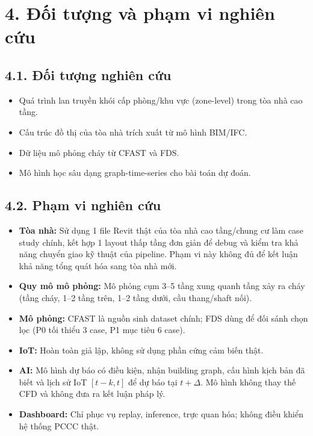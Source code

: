 \section*{4. Đối tượng và phạm vi nghiên cứu}

\subsection*{4.1. Đối tượng nghiên cứu}

\begin{itemize}
  \item Quá trình lan truyền khói cấp phòng/khu vực (zone-level) trong tòa nhà cao tầng.
  \item Cấu trúc đồ thị của tòa nhà trích xuất từ mô hình BIM/IFC.
  \item Dữ liệu mô phỏng cháy từ CFAST và FDS.
  \item Mô hình học sâu dạng graph-time-series cho bài toán dự đoán.
\end{itemize}

\subsection*{4.2. Phạm vi nghiên cứu}

\begin{itemize}
  \item \textbf{Tòa nhà:} Sử dụng 1 file Revit thật của tòa nhà cao tầng/chung cư làm case study chính, kết hợp 1 layout thấp tầng đơn giản để debug và kiểm tra khả năng chuyển giao kỹ thuật của pipeline. Phạm vi này không đủ để kết luận khả năng tổng quát hóa sang tòa nhà mới.
  \item \textbf{Quy mô mô phỏng:} Mô phỏng cụm 3–5 tầng xung quanh tầng xảy ra cháy (tầng cháy, 1–2 tầng trên, 1–2 tầng dưới, cầu thang/shaft nối).
  \item \textbf{Mô phỏng:} CFAST là nguồn sinh dataset chính; FDS dùng để đối sánh chọn lọc (P0 tối thiểu 3 case, P1 mục tiêu 6 case).
  \item \textbf{IoT:} Hoàn toàn giả lập, không sử dụng phần cứng cảm biến thật.
  \item \textbf{AI:} Mô hình dự báo có điều kiện, nhận building graph, cấu hình kịch bản đã biết và lịch sử IoT $[t-k,t]$ để dự báo tại $t+\Delta$. Mô hình không thay thế CFD và không đưa ra kết luận pháp lý.
  \item \textbf{Dashboard:} Chỉ phục vụ replay, inference, trực quan hóa; không điều khiển hệ thống PCCC thật.
\end{itemize}

